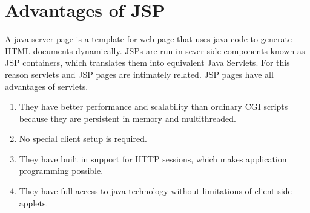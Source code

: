 \section{Advantages of JSP}
A java server page is a template for web page that uses java code to generate HTML documents dynamically. JSPs are run in sever side components known as JSP containers, which translates them into equivalent Java Servlets. For this reason servlets and JSP pages are intimately related. JSP pages have all advantages of servlets.
\begin{enumerate}
	\item	They have better performance and scalability than ordinary CGI scripts because they are persistent in memory and multithreaded.
	\item	No special client setup is required.
	\item	They have built in support for HTTP sessions, which makes application programming possible.
	\item	They have full access to java technology without limitations of client side applets.
\end{enumerate}